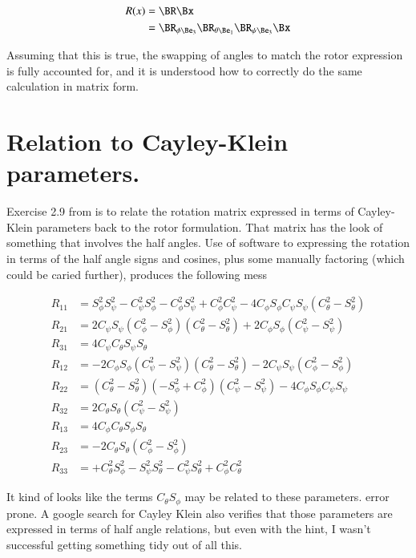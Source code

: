 \documentclass{article}
\begin{document}
\begin{align}\label{eqn:fixed}
R(x) &= \BR \Bx \\
&= 
\BR_{\phi \Be_3} 
\BR_{\theta \Be_1}
\BR_{\psi \Be_3}
\Bx
\end{align}

Assuming that this is true, the swapping of angles to match the rotor expression is fully accounted for, and it is understood how to
correctly do the same calculation in matrix form.

\section{ Relation to Cayley-Klein parameters. }

Exercise 2.9 from \cite{doran2003gap} is to relate the rotation matrix expressed in terms of Cayley-Klein parameters back to the rotor
formulation.  That matrix has the look of something that involves the half angles.  Use of software to expressing the rotation in terms of the 
half angle signs and cosines, plus some manually factoring (which could be caried
further), produces the following mess

\begin{align*}
R_{11} &= S_\phi^2 S_\psi^2 - C_\psi^2 S_\phi^2 - C_\phi^2 S_\psi^2 + C_\phi^2 C_\psi^2 - 4 C_\phi S_\phi C_\psi S_\psi (C_\theta^2 - S_\theta^2) \\
R_{21} &= 2 C_\psi S_\psi (C_\phi^2 -S_\phi^2 )(C_\theta^2 -S_\theta^2)
+2 C_\phi S_\phi (C_\psi^2 -S_\psi^2) \\
R_{31} &= 4 C_\psi C_\theta S_\psi S_\theta  \\
R_{12} &= -2 C_\phi S_\phi ( C_\psi^2 -S_\psi^2 )(C_\theta^2 - S_\theta^2) - 2 C_\psi S_\psi ( C_\phi^2 -S_\phi^2 ) \\
R_{22} &= (C_\theta^2 -S_\theta^2)(-S_\phi^2 + C_\phi^2)(C_\psi^2 -S_\psi^2) -4 C_\phi S_\phi C_\psi S_\psi  \\
R_{32} &= 2 C_\theta S_\theta ( C_\psi^2 - S_\psi^2 ) \\ 
R_{13} &= 4 C_\phi C_\theta S_\phi S_\theta  \\
R_{23} &= -2 C_\theta S_\theta ( C_\phi^2 - S_\phi^2 ) \\
R_{33} &= + C_\theta^2 S_\phi^2 - S_\psi^2 S_\theta^2 - C_\psi^2 S_\theta^2 + C_\phi^2 C_\theta^2 
\end{align*}

It kind of looks like the terms $C_\theta S_\phi$ may be related to these parameters.
error prone.  A google search for Cayley Klein also verifies that those parameters are expressed in terms of half angle relations, but even 
with the hint, I wasn't successful getting something tidy out of all this.
\end{document}
